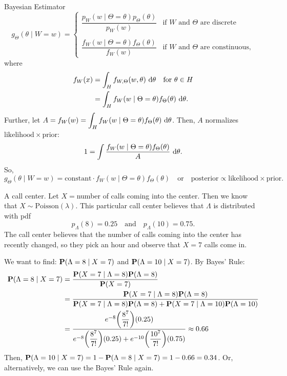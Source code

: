 \begin{thm}{Bayesian Estimator}
	\[g_\Theta(\theta\mid W=w)=\begin{cases}\dfrac{p_W(w\mid\Theta=\theta)p_\Theta(\theta)}{p_W(w)}&\text{if }W\text{ and }\Theta\text{ are discrete}\\\\\dfrac{f_W(w\mid\Theta=\theta)f_\Theta(\theta)}{f_W(w)}&\text{if }W\text{ and }\Theta\text{ are constinuous},\end{cases}\]	
	where \begin{align*}f_W(x)&=\int_Hf_{W,\Theta}(w,\theta)\ \d{\theta}\quad\text{for }\theta\in H\\&=\int_Hf_W(w\mid\Theta=\theta)f_\Theta(\theta)\ \d{\theta}.\end{align*} Further, let $A=f_W(w)=\dsst\int_Hf_W(w\mid\Theta=\theta)f_\Theta(\theta)\ \d{\theta}$. Then, $A$ normalizes $\mathrm{likelihood}\times\mathrm{prior}$: \[1=\int\dfrac{f_W(w\mid\Theta=\theta)f_\Theta(\theta)}{A}\ \d{\theta}.\] So, \[g_\Theta(\theta\mid W=w)=\text{constant}\cdot f_W(w\mid\Theta=\theta)f_\Theta(\theta)\quad\text{or}\quad\mathrm{posterior}\propto\mathrm{likelihood}\times\mathrm{prior}.\]
\end{thm}
\begin{eg}
	A call center. Let $X=$number of calls coming into the center. Then we know that $X\sim\text{Poisson}(\lambda)$. This particular call center believes that $\Lambda$ is distributed with pdf \[p_\Lambda(8)=0.25\quad\text{and}\quad p_\Lambda(10)=0.75.\] The call center believes that the number of calls coming into the center has recently changed, so they pick an hour and observe that $X=7$ calls come in. 
	\begin{sol}
		We want to find: $\P(\Lambda=8\mid X=7)$ and $\P(\Lambda=10\mid X=7)$. By Bayes' Rule: \begin{align*}
			\P(\Lambda=8\mid X=7)&=\dfrac{\P(X=7\mid \Lambda=8)\P(\Lambda=8)}{\P(X=7)}\\&=\dfrac{\P(X=7\mid \Lambda=8)\P(\Lambda=8)}{\P(X=7\mid \Lambda=8)\P(\Lambda=8)+\P(X=7\mid \Lambda=10)\P(\Lambda=10)}\\&=\dfrac{e^{-8}\qty(\dfrac{8^7}{7!})(0.25)}{e^{-8}\qty(\dfrac{8^7}{7!})(0.25)+e^{-10}\qty(\dfrac{10^7}{7!})(0.75)}\approx0.66
		\end{align*}
		Then, $\P(\Lambda=10\mid X=7)=1-\P(\Lambda=8\mid X=7)=1-0.66=0.34$. Or, alternatively, we can use the Bayes' Rule again. 
	\end{sol}
\end{eg}
